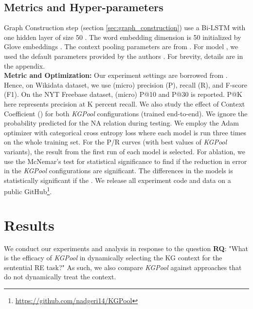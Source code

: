 \documentclass[11pt,a4paper]{article}
\begin{document}
\subsection{Metrics and Hyper-parameters}
Graph Construction step (section \ref{sec:graph_construction}) use a Bi-LSTM with one hidden layer of size 50 \cite{bastos2020recon}. The word embedding dimension is 50 initialized by Glove embeddings \cite{pennington2014glove}. The context pooling parameters are from \cite{lee2019self}. For model , we used the default parameters provided by the authors \cite{DBLP:conf/acl/ZhuLLFCS19,DBLP:conf/emnlp/SorokinG17}. For brevity, details are in the appendix.\\
\textbf{Metric and Optimization:} Our experiment settings are borrowed from \cite{bastos2020recon}. Hence, on Wikidata dataset, we use (micro) precision (P), recall (R), and F-score (F1). On the NYT Freebase dataset, (micro) P@10 and P@30 is reported. P@K here represents precision at K percent recall. 
We also study the effect of Context Coefficient () for both \textit{KGPool} configurations (trained end-to-end). We ignore the probability predicted for the NA relation during testing. 
We employ the Adam optimizer \cite{DBLP:journals/corr/KingmaB14} with categorical cross entropy loss where each model is run three times on the whole training set. For the P/R curves (with best  values of \textit{KGPool} variants), the result from the first run of each model is selected. For ablation, we use the McNemar's test for statistical significance to find if the reduction in error in the \textit{KGPool} configurations are significant.
 The differences in the models is statistically significant if the  \cite{dietterich1998approximate}. We release all experiment code and data on a public GitHub\footnote{\url{https://github.com/nadgeri14/KGPool}}.













\section{Results}\label{sec:results}
We conduct our experiments and analysis in response to  the question \textbf{RQ}: "What is the efficacy of \textit{KGPool} in dynamically selecting the KG context for the sentential RE task?" As such, we also compare \textit{KGPool} against approaches that do not dynamically treat the context.
\end{document}
